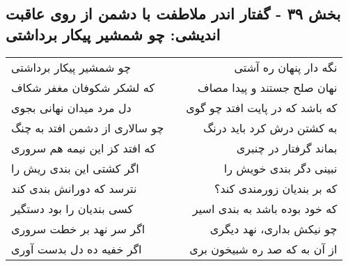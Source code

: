 \begin{center}
\section*{بخش ۳۹ - گفتار اندر ملاطفت با دشمن از روی عاقبت اندیشی: چو شمشیر پیکار برداشتی}
\label{sec:039}
\begin{longtable}{l p{0.5cm} r}
چو شمشیر پیکار برداشتی
&&
نگه دار پنهان ره آشتی
\\
که لشکر شکوفان مغفر شکاف
&&
نهان صلح جستند و پیدا مصاف
\\
دل مرد میدان نهانی بجوی
&&
که باشد که در پایت افتد چو گوی
\\
چو سالاری از دشمن افتد به چنگ
&&
به کشتن درش کرد باید درنگ
\\
که افتد کز این نیمه هم سروری
&&
بماند گرفتار در چنبری
\\
اگر کشتی این بندی ریش را
&&
نبینی دگر بندی خویش را
\\
نترسد که دورانش بندی کند
&&
که بر بندیان زورمندی کند؟
\\
کسی بندیان را بود دستگیر
&&
که خود بوده باشد به بندی اسیر
\\
اگر سر نهد بر خطت سروری
&&
چو نیکش بداری، نهد دیگری
\\
اگر خفیه ده دل بدست آوری
&&
از آن به که صد ره شبیخون بری
\\
\end{longtable}
\end{center}

